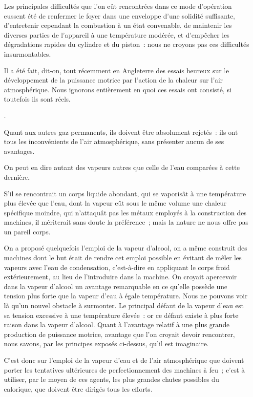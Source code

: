 \documentclass[french,twoside]{book} %
\begin{document}
{ Les principales difficultés que l’on eût rencontrées dans ce mode d’opération eussent été de renfermer le foyer dans une enveloppe d’une solidité suffisante, d’entretenir cependant la combustion à un état convenable, de maintenir les diverses parties de l’appareil à une température modérée, et d’empêcher les dégradations rapides du cylindre et du piston : nous ne croyons pas ces difficultés insurmontables.\par
 Il a été fait, dit-on, tout récemment en Angleterre des essais heureux sur le développement de la puissance motrice par l’action de la chaleur sur l’air atmosphérique. Nous ignorons entièrement en quoi ces essais ont consisté, si toutefois ils sont réels.
 }.\par
Quant aux autres gaz permanents, ils doivent être absolument rejetés : ils ont tous les inconvénients de l’air atmosphérique, sans présenter aucun de ses avantages.\par
On peut en dire autant des vapeurs autres que celle de l’eau comparées à cette dernière.\par
S’il se rencontrait un corps liquide abondant, qui se vaporisât à une température plus élevée que l’eau, dont la vapeur eût sous le même volume une chaleur spécifique moindre, qui n’attaquât pas les métaux employés à la construction des machines, il mériterait sans doute la préférence ; mais la nature ne nous offre pas un pareil corps.\par
On a proposé quelquefois l’emploi de la vapeur d’alcool, on a même construit des machines dont le but était de rendre cet emploi possible en évitant de mêler les vapeurs avec l’eau de condensation, c’est-à-dire en appliquant le corps froid extérieurement, au lieu de l’introduire dans la machine. On croyait apercevoir dans la vapeur d’alcool un avantage remarquable en ce qu’elle possède une tension plus forte que la vapeur d’eau à égale température. Nous ne pouvons voir là qu’un nouvel obstacle à surmonter. Le principal défaut de la vapeur d’eau est sa tension excessive à une température élevée : or ce défaut existe à plus forte raison dans la vapeur d’alcool. Quant à l’avantage relatif à une plus grande production de puissance motrice, avantage que l’on croyait devoir rencontrer, nous savons, par les principes exposés ci-dessus, qu’il est imaginaire.\par
C’est donc sur l’emploi de la vapeur d’eau et de l’air atmosphérique que doivent porter les tentatives ultérieures de perfectionnement des machines à feu ; c’est à utiliser, par le moyen de ces agents, les plus grandes chutes possibles du calorique, que doivent être dirigés tous les efforts.\par
\end{document}

